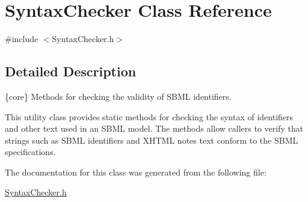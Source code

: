\hypertarget{class_syntax_checker}{}\section{Syntax\+Checker Class Reference}
\label{class_syntax_checker}


{\ttfamily \#include $<$Syntax\+Checker.\+h$>$}



\subsection{Detailed Description}
\{core\} Methods for checking the validity of S\+B\+ML identifiers.



This utility class provides static methods for checking the syntax of identifiers and other text used in an S\+B\+ML model. The methods allow callers to verify that strings such as S\+B\+ML identifiers and X\+H\+T\+ML notes text conform to the S\+B\+ML specifications. 

The documentation for this class was generated from the following file\+:\begin{DoxyCompactItemize}
\item 
\hyperlink{_syntax_checker_8h}{Syntax\+Checker.\+h}\end{DoxyCompactItemize}
